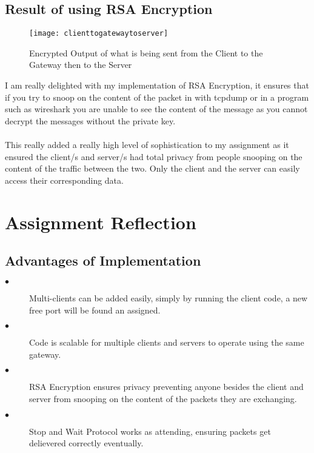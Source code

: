 \documentclass[10pt]{article}
\begin{document}
	\subsection{Result of using RSA Encryption}
		\begin{description}
		\item
		\begin{figure}[h!]
			\texttt{[image: clienttogatewaytoserver]}
			\caption{Encrypted Output of what is being sent from the Client to the Gateway then to the Server}
			\label{fig:rsaEncryption}
		\end{figure}
	\end{description}
I am really delighted with my implementation of RSA Encryption, it ensures that if you try to snoop on the content of the packet in with tcpdump or in a program such as wireshark you are unable to see the content of the message as you cannot decrypt the messages without the private key.\\\\This really added a really high level of sophistication to my assignment as it ensured the client/s and server/s had total privacy from people snooping on the content of the traffic between the two. Only the client and the server can easily access their corresponding data.\newpage
\section{Assignment Reflection}
	\subsection{Advantages of Implementation}
	\begin{description}
		\item[$\bullet$ ] Multi-clients can be added easily, simply by running the client code, a new free port will be found an assigned.
		\item[$\bullet$ ] Code is scalable for multiple clients and servers to operate using the same gateway.
		\item[$\bullet$ ] RSA Encryption ensures privacy preventing anyone besides the client and server from snooping on the content of the packets they are exchanging.
		\item[$\bullet$ ] Stop and Wait Protocol works as attending, ensuring packets get delievered correctly eventually.
	\end{description}
\end{document}

